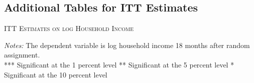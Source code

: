 \begin{appendices}
\newpage

\subsection{Additional Tables for ITT Estimates} \label{appendix_itt_estimates}

\begin{table}[H]
\centering
\caption{\textsc{ITT Estimates on log Household Income}}



\medskip


\label{tab:table_complete_nocontr}
\bigskip
\raggedright
\footnotesize
\textit{Notes:} The dependent variable is log household income 18 months after random assignment. \\
*** Significant at the 1 percent level ** Significant at the 5 percent level * Significant at the 10 percent level
\end{table}

\end{appendices}
